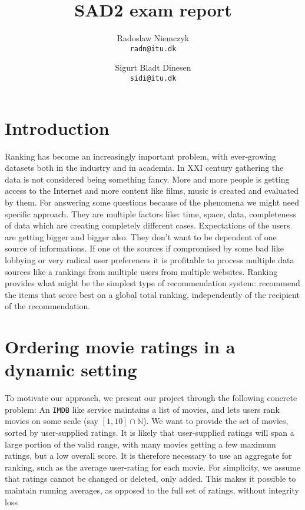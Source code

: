 \documentclass[a4paper, titlepage]{report}
\renewcommand{\%}{\scalebox{.9}{\oldpct}}
\begin{document}
\title{SAD2 exam report}
\author{
	Radoslaw Niemczyk
	\\\texttt{radn@itu.dk}
	\and
	Sigurt Bladt Dinesen
	\\\texttt{sidi@itu.dk}
}

\maketitle

\section*{Introduction}
Ranking has become an increasingly important problem, with ever-growing datasets
both in the industry and in academia. In XXI century gathering the data is not
considered being something fancy. More and more people is getting access to the
Internet and more content like films, music is created and evaluated by them.
For answering some questions because of the phenomena
we might need specific approach. They are multiple factors
like: time, space, data, completeness of data which are creating completely different
cases.
Expectations of the users are getting bigger and bigger also. They don't want to
be dependent of one source of informations. If one ot the sources if compromised
by some bad like lobbying or very radical user preferences it is profitable to
process multiple data sources like a rankings from multiple users from multiple
websites.
Ranking provides what might be the simplest type of recommendation system:
recommend the items that score best on a global total ranking, independently of
the recipient of the recommendation.

\section*{Ordering movie ratings in a dynamic setting}
To motivate our approach, we present our project through the following concrete
problem: An \texttt{IMDB} like service maintains a list of movies, and lets
users rank movies on some scale (say $\left[1,10\right]\cap \mathbb{N}$). We
want to provide the set of movies, sorted by user-supplied ratings. It is likely
that  user-supplied ratings will span a large portion of the valid range, with
many movies getting a few maximum ratings, but a low overall score. It is
therefore necessary to use an aggregate for ranking, such as the average
user-rating for each movie. For simplicity, we assume that ratings cannot be
changed or deleted, only added. This makes it possible to maintain running
averages, as
opposed to the full set of ratings, without integrity loss
\end{document}
